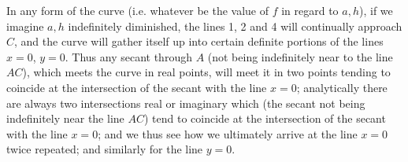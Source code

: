 \documentclass[11pt,a4paper]{article}
\theoremstyle{plain}
\theoremstyle{definition}
\begin{document}
In any form of the curve (i.e. whatever be the value of $f$ in regard to
$a,h$), if we imagine $a,h$ indefinitely diminished, the lines 1, 2 and 4
will continually approach $C$, and the curve will gather itself up into
certain definite portions of the lines $x=0$, $y=0$. Thus any secant through
$A$ (not being indefinitely near to the line $AC$), which meets the curve in
real points, will meet it in two points tending to coincide at the
intersection of the secant with the line $x=0$; analytically there are always
two intersections real or imaginary which (the secant not being indefinitely
near the line $AC$) tend to coincide at the intersection of the secant with
the line $x=0$; and we thus see how we ultimately arrive at the line $x=0$
twice repeated; and similarly for the line $y=0$.
\end{document}
